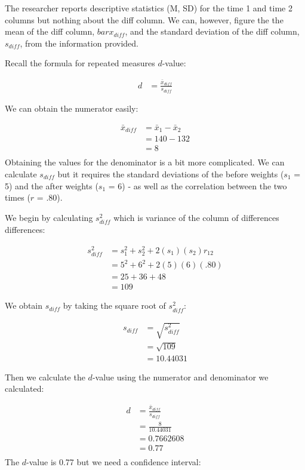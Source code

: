\documentclass[
]{krantz}
\begin{document}
The researcher reports descriptive statistics (M, SD) for the time 1 and time 2 columns but nothing about the diff column. We can, however, figure the the mean of the diff column, \(bar{x}_{diff}\), and the standard deviation of the diff column, \(s_{diff}\), from the information provided.

Recall the formula for repeated measures \(d\)-value:

\[
\begin{aligned}
d & = \frac{\bar{x}_{diff}}{s_{diff}}
\end{aligned}
\]

We can obtain the numerator easily:

\[
\begin{aligned}
\bar{x}_{diff} & = \bar{x}_1 - \bar{x}_2 \\
&= 140 - 132 \\
&= 8 \\
\end{aligned}
\]
Obtaining the values for the denominator is a bit more complicated. We can calculate \(s_{diff}\) but it requires the standard deviations of the before weights (\(s_1\) = 5) and the after weights (\(s_1\) = 6) - as well as the correlation between the two times (\(r\) = .80).

We begin by calculating \(s_{diff}^2\) which is variance of the column of differences differences:

\[
\begin{aligned}
s_{diff}^2 & = s_1^2 + s_2^2 + 2(s_1)(s_2)r_{12} \\
& = 5^2  + 6^2 + 2(5)(6)(.80)\\
& = 25  + 36 + 48\\
& = 109
\end{aligned}
\]

We obtain \(s_{diff}\) by taking the square root of \(s_{diff}^2\):

\[
\begin{aligned}
s_{diff} & = \sqrt{s_{diff}^2} \\
& = \sqrt{109}\\
& = 10.44031
\end{aligned}
\]

Then we calculate the \(d\)-value using the numerator and denominator we calculated:

\[
\begin{aligned}
d & = \frac{\bar{x}_{diff}}{s_{diff}}\\
& = \frac{8}{10.44031} \\
& = 0.7662608\\
& = 0.77\\
\end{aligned}
\]
The \(d\)-value is 0.77 but we need a confidence interval:
\end{document}
